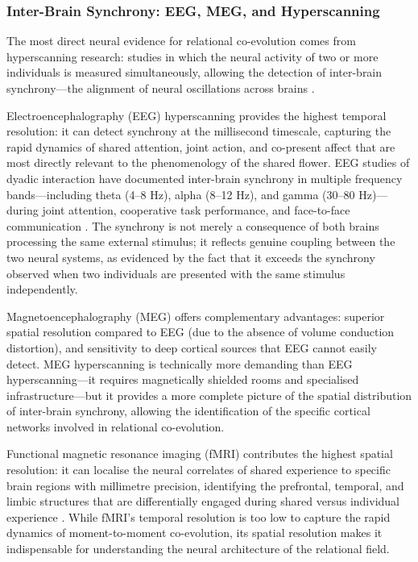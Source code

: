\subsubsection{Inter-Brain Synchrony: EEG, MEG, and Hyperscanning}
\label{p14:subsubsec:hyperscanning}

\noindent
The most direct neural evidence for relational co-evolution comes from hyperscanning research: studies in which the neural activity of two or more individuals is measured simultaneously, allowing the detection of inter-brain synchrony---the alignment of neural oscillations across brains \parencite{hasson2012,dikker2017}.

Electroencephalography (EEG) hyperscanning provides the highest temporal resolution: it can detect synchrony at the millisecond timescale, capturing the rapid dynamics of shared attention, joint action, and co-present affect that are most directly relevant to the phenomenology of the shared flower. EEG studies of dyadic interaction have documented inter-brain synchrony in multiple frequency bands---including theta (4--8 Hz), alpha (8--12 Hz), and gamma (30--80 Hz)---during joint attention, cooperative task performance, and face-to-face communication \parencite{liu2023}. The synchrony is not merely a consequence of both brains processing the same external stimulus; it reflects genuine coupling between the two neural systems, as evidenced by the fact that it exceeds the synchrony observed when two individuals are presented with the same stimulus independently.

Magnetoencephalography (MEG) offers complementary advantages: superior spatial resolution compared to EEG (due to the absence of volume conduction distortion), and sensitivity to deep cortical sources that EEG cannot easily detect. MEG hyperscanning is technically more demanding than EEG hyperscanning---it requires magnetically shielded rooms and specialised infrastructure---but it provides a more complete picture of the spatial distribution of inter-brain synchrony, allowing the identification of the specific cortical networks involved in relational co-evolution.

Functional magnetic resonance imaging (fMRI) contributes the highest spatial resolution: it can localise the neural correlates of shared experience to specific brain regions with millimetre precision, identifying the prefrontal, temporal, and limbic structures that are differentially engaged during shared versus individual experience \parencite{hasson2012}. While fMRI's temporal resolution is too low to capture the rapid dynamics of moment-to-moment co-evolution, its spatial resolution makes it indispensable for understanding the neural architecture of the relational field.

